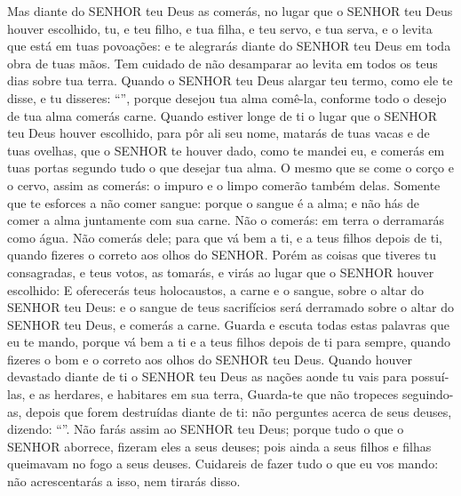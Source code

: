 {{  Mas diante do SENHOR teu Deus as comerás, no lugar que o SENHOR teu Deus houver escolhido, tu, e teu filho, e tua filha, e teu servo, e tua serva, e o levita que está em tuas povoações: e te alegrarás diante do SENHOR teu Deus em toda obra de tuas mãos.
  Tem cuidado de não desamparar ao levita em todos os teus dias sobre tua terra.
  Quando o SENHOR teu Deus alargar teu termo, como ele te disse, e tu disseres: \enquote{}, porque desejou tua alma comê-la, conforme todo o desejo de tua alma comerás carne.
  Quando estiver longe de ti o lugar que o SENHOR teu Deus houver escolhido, para pôr ali seu nome, matarás de tuas vacas e de tuas ovelhas, que o SENHOR te houver dado, como te mandei eu, e comerás em tuas portas segundo tudo o que desejar tua alma.
  O mesmo que se come o corço e o cervo, assim as comerás: o impuro e o limpo comerão também delas.
  Somente que te esforces a não comer sangue: porque o sangue é a alma; e não hás de comer a alma juntamente com sua carne.
  Não o comerás: em terra o derramarás como água.
  Não comerás dele; para que vá bem a ti, e a teus filhos depois de ti, quando fizeres o correto aos olhos do SENHOR.
  Porém as coisas que tiveres tu consagradas, e teus votos, as tomarás, e virás ao lugar que o SENHOR houver escolhido:
  E oferecerás teus holocaustos, a carne e o sangue, sobre o altar do SENHOR teu Deus: e o sangue de teus sacrifícios será derramado sobre o altar do SENHOR teu Deus, e comerás a carne.
  Guarda e escuta todas estas palavras que eu te mando, porque vá bem a ti e a teus filhos depois de ti para sempre, quando fizeres o bom e o correto aos olhos do SENHOR teu Deus.
  Quando houver devastado diante de ti o SENHOR teu Deus as nações aonde tu vais para possuí-las, e as herdares, e habitares em sua terra,
  Guarda-te que não tropeces seguindo-as, depois que forem destruídas diante de ti: não perguntes acerca de seus deuses, dizendo: \enquote{}.
  Não farás assim ao SENHOR teu Deus; porque tudo o que o SENHOR aborrece, fizeram eles a seus deuses; pois ainda a seus filhos e filhas queimavam no fogo a seus deuses.
  Cuidareis de fazer tudo o que eu vos mando: não acrescentarás a isso, nem tirarás disso}.
\par }

